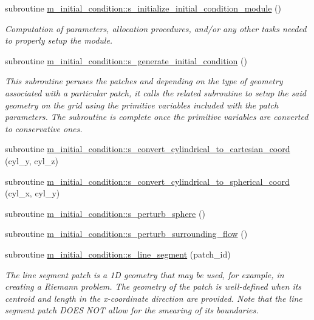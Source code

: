 \begin{DoxyCompactItemize}
subroutine \hyperlink{namespacem__initial__condition_a07a665ff41297455ac2da7b54243bac5}{m\+\_\+initial\+\_\+condition\+::s\+\_\+initialize\+\_\+initial\+\_\+condition\+\_\+module} ()
\begin{DoxyCompactList}\small\item\em Computation of parameters, allocation procedures, and/or any other tasks needed to properly setup the module. \end{DoxyCompactList}\item 
subroutine \hyperlink{namespacem__initial__condition_aa74a70029e3ec0fd3225b369e7c5443e}{m\+\_\+initial\+\_\+condition\+::s\+\_\+generate\+\_\+initial\+\_\+condition} ()
\begin{DoxyCompactList}\small\item\em This subroutine peruses the patches and depending on the type of geometry associated with a particular patch, it calls the related subroutine to setup the said geometry on the grid using the primitive variables included with the patch parameters. The subroutine is complete once the primitive variables are converted to conservative ones. \end{DoxyCompactList}\item 
subroutine \hyperlink{namespacem__initial__condition_a791e5fa466dd15343882711c91bae63d}{m\+\_\+initial\+\_\+condition\+::s\+\_\+convert\+\_\+cylindrical\+\_\+to\+\_\+cartesian\+\_\+coord} (cyl\+\_\+y, cyl\+\_\+z)
\item 
subroutine \hyperlink{namespacem__initial__condition_a88d2e8debdc097d4d811fb67d6fbc880}{m\+\_\+initial\+\_\+condition\+::s\+\_\+convert\+\_\+cylindrical\+\_\+to\+\_\+spherical\+\_\+coord} (cyl\+\_\+x, cyl\+\_\+y)
\item 
subroutine \hyperlink{namespacem__initial__condition_afef3f507e182798fcfd7aecc52878fc9}{m\+\_\+initial\+\_\+condition\+::s\+\_\+perturb\+\_\+sphere} ()
\item 
subroutine \hyperlink{namespacem__initial__condition_ab66e3b04024a8ae7327857b1b265bc27}{m\+\_\+initial\+\_\+condition\+::s\+\_\+perturb\+\_\+surrounding\+\_\+flow} ()
\item 
subroutine \hyperlink{namespacem__initial__condition_a3be32c8ee8a7dffae734d063200471e8}{m\+\_\+initial\+\_\+condition\+::s\+\_\+line\+\_\+segment} (patch\+\_\+id)
\begin{DoxyCompactList}\small\item\em The line segment patch is a 1D geometry that may be used, for example, in creating a Riemann problem. The geometry of the patch is well-\/defined when its centroid and length in the x-\/coordinate direction are provided. Note that the line segment patch D\+O\+ES N\+OT allow for the smearing of its boundaries. \end{DoxyCompactList}\item 

\end{DoxyCompactItemize}
